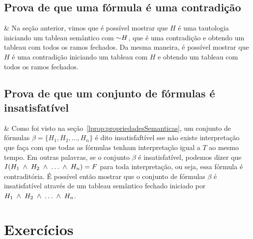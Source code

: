 \subsection{Prova de que uma fórmula é uma contradição}

\begin{easylist}

& Na seção anterior, vimos que é possível mostrar que $H$ é uma tautologia iniciando um tableau semântico com $\mathord{\sim} H$, que é uma contradição e obtendo um tableau com todos os ramos fechados. Da mesma maneira, é possível mostrar que $H$ é uma contradição iniciando um tableau com $H$ e obtendo um tableau com todos os ramos fechados.  

\end{easylist}


\subsection{Prova de que um conjunto de fórmulas é insatisfatível}

\begin{easylist}

& Como foi visto na seção~\ref{lprop:propriedadesSemanticas}, um conjunto de fórmulas $\beta = \{H_1, H_2, \dots, H_n\}$ é dito insatisfaftível sse não existe interpretação que faça com que todas as fórmulas tenham interpretação igual a $T$ ao mesmo tempo. Em outras palavras, se o conjunto $\beta$ é insatisfatível, podemos dizer que $I(H_1 \;\land\; H_2 \;\land\; \dots \;\land\; H_n) = F$ para toda interpretação, ou seja, essa fórmula é contraditória. É possível então mostrar que o conjunto de fórmulas $\beta$ é insatisfatível através de um tableau semântico fechado iniciado por $H_1 \;\land\; H_2 \;\land\; \dots \;\land\; H_n$.


\end{easylist}




\section{Exercícios}

